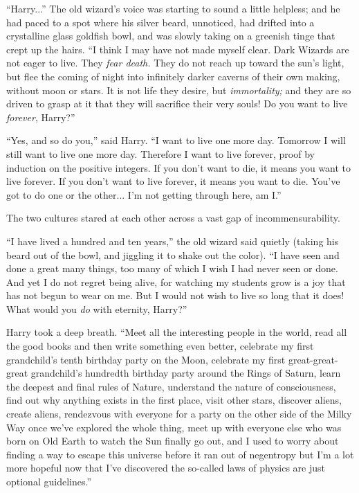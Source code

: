 “Harry...” The old wizard’s voice was starting to sound a little helpless; and he had paced to a spot where his silver beard, unnoticed, had drifted into a crystalline glass goldfish bowl, and was slowly taking on a greenish tinge that crept up the hairs. “I think I may have not made myself clear. Dark Wizards are not eager to live. They \emph{fear death.} They do not reach up toward the sun’s light, but flee the coming of night into infinitely darker caverns of their own making, without moon or stars. It is not life they desire, but \emph{immortality;} and they are so driven to grasp at it that they will sacrifice their very souls! Do you want to live \emph{forever}, Harry?”

“Yes, and so do you,” said Harry. “I want to live one more day. Tomorrow I will still want to live one more day. Therefore I want to live forever, proof by induction on the positive integers. If you don’t want to die, it means you want to live forever. If you don’t want to live forever, it means you want to die. You’ve got to do one or the other... I’m not getting through here, am I.”

The two cultures stared at each other across a vast gap of incommensurability.

“I have lived a hundred and ten years,” the old wizard said quietly (taking his beard out of the bowl, and jiggling it to shake out the color). “I have seen and done a great many things, too many of which I wish I had never seen or done. And yet I do not regret being alive, for watching my students grow is a joy that has not begun to wear on me. But I would not wish to live so long that it does! What would you \emph{do} with eternity, Harry?”

Harry took a deep breath. “Meet all the interesting people in the world, read all the good books and then write something even better, celebrate my first grandchild’s tenth birthday party on the Moon, celebrate my first great-great-great grandchild’s hundredth birthday party around the Rings of Saturn, learn the deepest and final rules of Nature, understand the nature of consciousness, find out why anything exists in the first place, visit other stars, discover aliens, create aliens, rendezvous with everyone for a party on the other side of the Milky Way once we’ve explored the whole thing, meet up with everyone else who was born on Old Earth to watch the Sun finally go out, and I used to worry about finding a way to escape this universe before it ran out of negentropy but I’m a lot more hopeful now that I’ve discovered the so-called laws of physics are just optional guidelines.”

